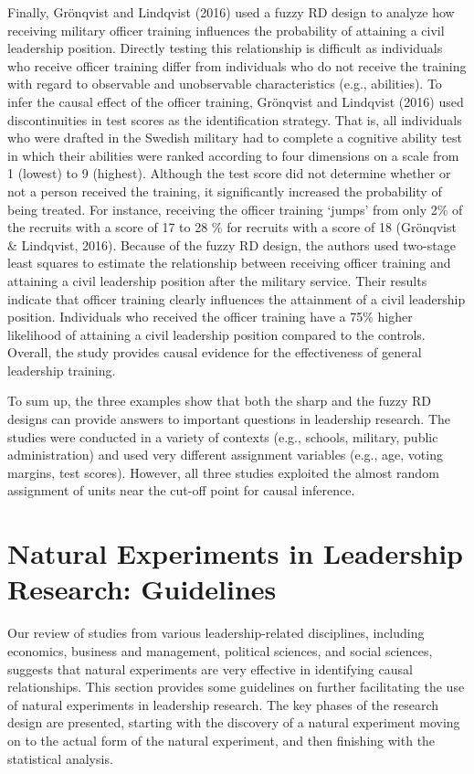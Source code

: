 \documentclass[english]{article}
\begin{document}
Finally, Grönqvist and Lindqvist (2016) used a fuzzy RD design to
analyze how receiving military officer training influences the
probability of attaining a civil leadership position. Directly testing
this relationship is difficult as individuals who receive officer
training differ from individuals who do not receive the training with
regard to observable and unobservable characteristics (e.g., abilities).
To infer the causal effect of the officer training, Grönqvist and
Lindqvist (2016) used discontinuities in test scores as the
identification strategy. That is, all individuals who were drafted in
the Swedish military had to complete a cognitive ability test in which
their abilities were ranked according to four dimensions on a scale from
1 (lowest) to 9 (highest). Although the test score did not determine
whether or not a person received the training, it significantly
increased the probability of being treated. For instance, receiving the
officer training `jumps' from only 2\% of the recruits with a score of
17 to 28 \% for recruits with a score of 18 (Grönqvist \& Lindqvist,
2016). Because of the fuzzy RD design, the authors used two-stage least
squares to estimate the relationship between receiving officer training
and attaining a civil leadership position after the military service.
Their results indicate that officer training clearly influences the
attainment of a civil leadership position. Individuals who received the
officer training have a 75\% higher likelihood of attaining a civil
leadership position compared to the controls. Overall, the study
provides causal evidence for the effectiveness of general leadership
training.

To sum up, the three examples show that both the sharp and the fuzzy RD
designs can provide answers to important questions in leadership
research. The studies were conducted in a variety of contexts (e.g.,
schools, military, public administration) and used very different
assignment variables (e.g., age, voting margins, test scores). However,
all three studies exploited the almost random assignment of units near
the cut-off point for causal inference. 


\section{Natural Experiments in Leadership Research: Guidelines}
\label{sec:guidelines}

\noindent Our review of studies from various leadership-related disciplines,
including economics, business and management, political sciences, and
social sciences, suggests that natural experiments are very effective in
identifying causal relationships. This section provides some guidelines
on further facilitating the use of natural experiments in leadership
research. The key phases of the research design are presented, starting
with the discovery of a natural experiment moving on to the actual form
of the natural experiment, and then finishing with the statistical
analysis. 
\end{document}
